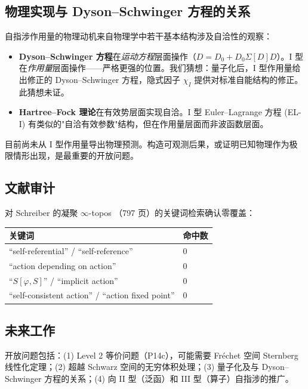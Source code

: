 \documentclass[12pt,a4paper]{article}
\theoremstyle{definition}
\begin{document}
\subsection{物理实现与 Dyson--Schwinger 方程的关系}

自指涉作用量的物理动机来自物理学中若干基本结构涉及自洽性的观察：
\begin{itemize}
\item \textbf{Dyson--Schwinger 方程}在\emph{运动方程}层面操作（$D = D_0 + D_0 \Sigma[D] D$）。I 型在\emph{作用量}层面操作——严格更强的位置。我们猜想：量子化后，I 型作用量给出修正的 Dyson--Schwinger 方程，隐式因子 $\chi_I$ 提供对标准自能结构的修正。此猜想未证。
\item \textbf{Hartree--Fock 理论}在有效势层面实现自洽。I 型 Euler--Lagrange 方程 (EL-I) 有类似的"自洽有效参数"结构，但在作用量层面而非波函数层面。
\end{itemize}

目前尚未从 I 型作用量导出物理预测。构造可观测后果，或证明已知物理作为极限情形出现，是最重要的开放问题。

\subsection{文献审计}
\label{sec:lit-audit}

对 Schreiber 的凝聚 $\infty$-topos \cite{Schreiber2013}（797 页）的关键词检索确认零覆盖：

\begin{center}
\begin{tabular}{ll}
\toprule
关键词 & 命中数 \\
\midrule
``self-referential'' / ``self-reference'' & 0 \\
``action depending on action'' & 0 \\
``$S[\varphi, S]$'' / ``implicit action'' & 0 \\
``self-consistent action'' / ``action fixed point'' & 0 \\
\bottomrule
\end{tabular}
\end{center}

\subsection{未来工作}

开放问题包括：(1) Level 2 等价问题（P14c），可能需要 Fr\'echet 空间 Sternberg 线性化定理；(2) 超越 Schwarz 空间的无穷体积处理；(3) 量子化及与 Dyson--Schwinger 方程的关系；(4) 向 II 型（泛函）和 III 型（算子）自指涉的推广。
\end{document}
